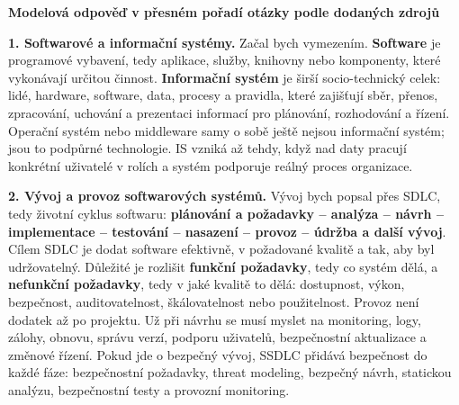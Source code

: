 

\begin{greenbox}
\textbf{Modelová odpověď v přesném pořadí otázky podle dodaných zdrojů}

\textbf{1. Softwarové a informační systémy.} Začal bych vymezením. \textbf{Software} je programové vybavení, tedy aplikace, služby, knihovny nebo komponenty, které vykonávají určitou činnost. \textbf{Informační systém} je širší socio-technický celek: lidé, hardware, software, data, procesy a pravidla, které zajišťují sběr, přenos, zpracování, uchování a prezentaci informací pro plánování, rozhodování a řízení. Operační systém nebo middleware samy o sobě ještě nejsou informační systém; jsou to podpůrné technologie. IS vzniká až tehdy, když nad daty pracují konkrétní uživatelé v rolích a systém podporuje reálný proces organizace.

\textbf{2. Vývoj a provoz softwarových systémů.} Vývoj bych popsal přes SDLC, tedy životní cyklus softwaru: \textbf{plánování a požadavky -- analýza -- návrh -- implementace -- testování -- nasazení -- provoz -- údržba a další vývoj}. Cílem SDLC je dodat software efektivně, v požadované kvalitě a tak, aby byl udržovatelný. Důležité je rozlišit \textbf{funkční požadavky}, tedy co systém dělá, a \textbf{nefunkční požadavky}, tedy v jaké kvalitě to dělá: dostupnost, výkon, bezpečnost, auditovatelnost, škálovatelnost nebo použitelnost. Provoz není dodatek až po projektu. Už při návrhu se musí myslet na monitoring, logy, zálohy, obnovu, správu verzí, podporu uživatelů, bezpečnostní aktualizace a změnové řízení. Pokud jde o bezpečný vývoj, SSDLC přidává bezpečnost do každé fáze: bezpečnostní požadavky, threat modeling, bezpečný návrh, statickou analýzu, bezpečnostní testy a provozní monitoring.


\end{greenbox}
